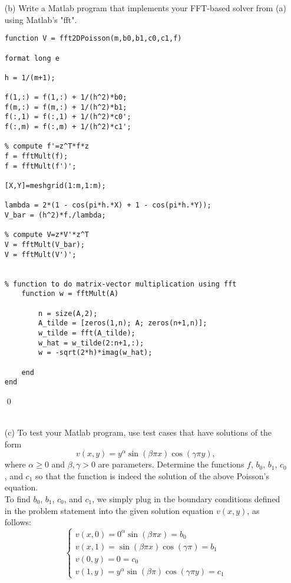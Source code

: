 \documentclass[12pt]{article}
\begin{document}
\begin{itemize}
\item[(b)] Write a Matlab program that implements your FFT-based solver from (a) using Matlab's "fft".\\

\lstset{language=matlab,frame=single}
\begin{lstlisting}[caption= FFT-Based Solver with Generalized BCs]
function V = fft2DPoisson(m,b0,b1,c0,c1,f)

format long e

h = 1/(m+1);

f(1,:) = f(1,:) + 1/(h^2)*b0;
f(m,:) = f(m,:) + 1/(h^2)*b1;
f(:,1) = f(:,1) + 1/(h^2)*c0';
f(:,m) = f(:,m) + 1/(h^2)*c1';

% compute f'=z^T*f*z
f = fftMult(f);
f = fftMult(f')';

[X,Y]=meshgrid(1:m,1:m);

lambda = 2*(1 - cos(pi*h.*X) + 1 - cos(pi*h.*Y));
V_bar = (h^2)*f./lambda;

% compute V=z*V'*z^T
V = fftMult(V_bar);
V = fftMult(V')';


% function to do matrix-vector multiplication using fft
    function w = fftMult(A)
        
        n = size(A,2);
        A_tilde = [zeros(1,n); A; zeros(n+1,n)];
        w_tilde = fft(A_tilde);
        w_hat = w_tilde(2:n+1,:);
        w = -sqrt(2*h)*imag(w_hat);
        
    end
end
\end{lstlisting}
\qed\\\\




\item[(c)]  To test your Matlab program, use test cases that have solutions of the form
$$v(x,y) = y^\alpha \sin(\beta\pi x)\cos(\gamma\pi y),$$
where $\alpha \geq 0$ and $\beta,\gamma > 0$ are parameters.  Determine the functions $f$, $b_0$, $b_1$, $c_0$, and $c_1$ so that the function is indeed the solution of the above Poisson's equation.\\

To find $b_0$, $b_1$, $c_0$, and $c_1$, we simply plug in the boundary conditions defined in the problem statement into the given solution equation $v(x,y)$, as follows:
\[\begin{cases}
v(x,0) = 0^\alpha\sin(\beta\pi x) = b_0 \nonumber \\
v(x,1) = \sin(\beta\pi x)\cos(\gamma\pi) = b_1 \nonumber \\
v(0,y) = 0 = c_0 \nonumber \\
v(1,y) = y^\alpha\sin(\beta\pi)\cos(\gamma\pi y) = c_1 \nonumber 
\end{cases}\]


\end{itemize}
\end{document}
